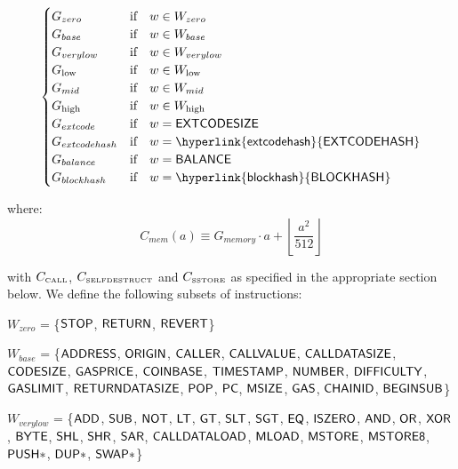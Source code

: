 \begin{equation}
\begin{cases}
G_{zero} & \text{if} \quad w \in W_{zero}\\
G_{base} & \text{if} \quad w \in W_{base}\\
G_{verylow} & \text{if} \quad w \in W_{verylow}\\
G_{\mathrm{low}} & \text{if} \quad w \in W_{\mathrm{low}}\\
G_{mid} & \text{if} \quad w \in W_{mid}\\
G_{\mathrm{high}} & \text{if} \quad w \in W_{\mathrm{high}}\\
G_{extcode} & \text{if} \quad w = \op{EXTCODESIZE}\\
G_{extcodehash} & \text{if} \quad w = \op{\hyperlink{extcodehash}{EXTCODEHASH}}\\
G_{balance} & \text{if} \quad w = \op{BALANCE}\\
G_{blockhash} & \text{if} \quad w = \op{\hyperlink{blockhash}{BLOCKHASH}}\\
\end{cases}
\end{equation}


where:
\begin{equation}
C_{mem}(a) \equiv G_{memory} \cdot a + \left\lfloor \dfrac{a^2}{512} \right\rfloor
\end{equation}

with $C_\text{\tiny CALL}$, $C_\text{\tiny SELFDESTRUCT}$ and $C_\text{\tiny SSTORE}$ as specified in the appropriate section below. We define the following subsets of instructions:

$W_{zero}$ = \{$\mathsf{STOP}$, $\mathsf{RETURN}$, $\mathsf{REVERT}$\}

$W_{base}$ = \{$\mathsf{ADDRESS}$, $\mathsf{ORIGIN}$, $\mathsf{CALLER}$, $\mathsf{CALLVALUE}$, $\mathsf{CALLDATASIZE}$, $\mathsf{CODESIZE}$, $\mathsf{GASPRICE}$, $\mathsf{COINBASE}$,
\newline \noindent\hspace*{1.75cm} $\mathsf{TIMESTAMP}$, $\mathsf{NUMBER}$, $\mathsf{DIFFICULTY}$, $\mathsf{GASLIMIT}$, $\mathsf{RETURNDATASIZE}$, $\mathsf{POP}$, $\mathsf{PC}$, $\mathsf{MSIZE}$, $\mathsf{GAS}$, 
\newline \noindent\hspace*{1.75cm} $\mathsf{CHAINID}$, $\mathsf{BEGINSUB}$\}

$W_{verylow}$ = \{$\mathsf{ADD}$, $\mathsf{SUB}$, $\mathsf{NOT}$, $\mathsf{LT}$, $\mathsf{GT}$, $\mathsf{SLT}$, $\mathsf{SGT}$, $\mathsf{EQ}$, $\mathsf{ISZERO}$, $\mathsf{AND}$, $\mathsf{OR}$, $\mathsf{XOR}$, $\mathsf{BYTE}$, $\mathsf{SHL}$, $\mathsf{SHR}$, $\mathsf{SAR}$, 
\newline \noindent\hspace*{1.75cm} $\mathsf{CALLDATALOAD}$, $\mathsf{MLOAD}$, $\mathsf{MSTORE}$, $\mathsf{MSTORE8}$, $\mathsf{PUSH*}$, $\mathsf{DUP*}$, $\mathsf{SWAP*}$\}

